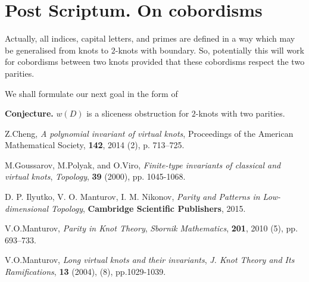 \documentclass[12pt]{article}
\theoremstyle{definition}
\theoremstyle{remark}
\begin{document}
\section{Post Scriptum. On cobordisms}

Actually, all indices, capital letters, and primes are defined in a way which may be
generalised from knots to $2$-knots with boundary. So, potentially this will work for 
cobordisms between two knots provided that these cobordisms respect the two parities.

We shall formulate our next goal in the form of 

{\bf Conjecture.}
$w(D)$ is a sliceness obstruction for $2$-knots with two parities.

\begin{thebibliography}{10}


 Z.Cheng, {\em A polynomial invariant of virtual knots},
{Proceedings of the American Mathematical Society},
{\bf 142}, 2014 (2), p. 713--725.

 M.Goussarov, M.Polyak, and O.Viro, {\em
Finite-type invariants of classical and virtual knots}, {\em Topology},
{\bf 39} (2000), pp. 1045-1068.

 D. P. Ilyutko,
V. O. Manturov, I. M. Nikonov, {\em Parity and Patterns in Low-dimensional Topology},
{\bf Cambridge Scientific Publishers}, 2015.



 V.O.Manturov, {\em Parity in Knot Theory}, {\em Sbornik Mathematics}, {\bf 201}, 
2010 (5), pp. 693--733.

 V.O.Manturov, {\em Long virtual knots and their invariants}, {\em J. Knot Theory and Its Ramifications},
{\bf 13 } (2004), (8), pp.1029-1039. 


\end{thebibliography}
\end{document}
